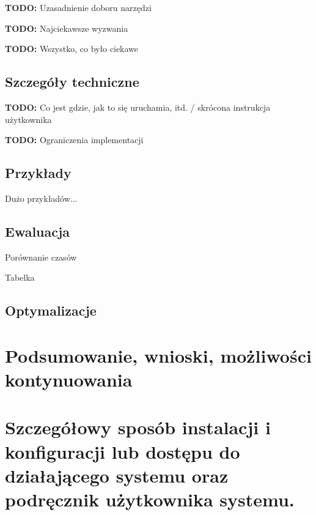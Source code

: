 \documentclass[english,shortabstract,mgr]{iithesis}
\newcommand{\todo}[1]{\textbf{TODO:} #1}
\begin{document}
\todo{Uzasadnienie doboru narzędzi}

\todo{Najciekawsze wyzwania}

\todo{Wszystko, co było ciekawe}

\section{Szczegóły techniczne}

\todo{Co jest gdzie, jak to się uruchamia, itd. / skrócona instrukcja użytkownika}

\todo{Ograniczenia implementacji}

\section{Przykłady}

Dużo przykładów...

\section{Ewaluacja}

Porównanie czasów

Tabelka

\section{Optymalizacje}

\chapter{Podsumowanie, wnioski, możliwości kontynuowania}

\appendix

\chapter{Szczegółowy sposób instalacji i konfiguracji lub dostępu do działającego systemu oraz podręcznik użytkownika systemu.}


\end{document}
